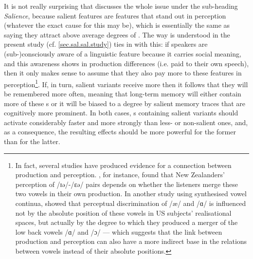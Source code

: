 It is not really surprising that \textcite{pierrehumbert2006} discusses the whole issue under the sub-heading \emph{Salience}, because salient features are features that stand out in perception (whatever the exact cause for this may be), which is essentially the same as saying they attract above average degrees of .
The way  is understood in the present study (cf. \ref{sec.sal.sal.study}) ties in with this: if speakers are (sub-)consciously aware of a linguistic feature because it carries social meaning, and this awareness shows in production differences (i.e.  paid to their own speech), then it only makes sense to assume that they also pay more  to these features in perception\footnote{In fact, several studies have produced evidence for a connection between production and perception. \cite{hayetal2006b}, for instance, found that New Zealanders' perception of /ɪə/-/ɛə/ pairs depends on whether the listeners merge these two vowels in their own production. In another study using synthesised vowel continua, \textcite{kendallfridland2017} showed that perceptual discrimination of /æ/ and /ɑ/ is influenced not by the absolute position of these vowels in US subjects' realisational spaces, but actually by the degree to which they produced a merger of the low back vowels /ɑ/ and /ɔ/ --- which suggests that the link between production and perception can also have a more indirect base in the relations between vowels instead of their absolute positions.}.
If, in turn, salient variants receive more  then it follows that they will be remembered more often, meaning that long-term memory will either contain more of these s or it will be biased to a degree by salient memory traces that are cognitively more prominent.
In both cases, s containing salient variants should activate considerably faster and more strongly than less- or non-salient ones, and, as a consequence, the resulting  effects should be more powerful for the former than for the latter.

